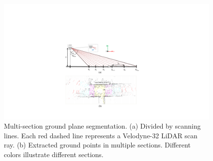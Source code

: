 \documentclass{sip}%
\begin{document}
\begin{figure}[t]
\setlength{\abovecaptionskip}{30pt}%
\setlength{\belowcaptionskip}{1pt}%
    \centering
    \includegraphics[width=\columnwidth]{lidar.pdf}
    \caption{Multi-section ground plane segmentation. (a) Divided by scanning lines. Each red dashed line represents a Velodyne-32 LiDAR scan ray. (b) Extracted ground points in multiple sections. Different colors illustrate different sections.}
    \label{fig:lidarscan}
\end{figure}
\end{document}
